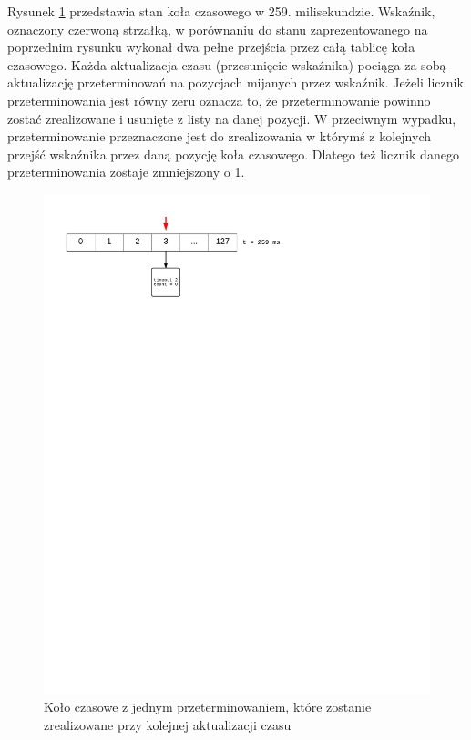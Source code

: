 Rysunek \ref{fig:tiw3} przedstawia stan koła czasowego w 259. milisekundzie.
Wskaźnik, oznaczony czerwoną strzałką, w porównaniu do stanu zaprezentowanego na poprzednim rysunku wykonał dwa pełne przejścia przez całą tablicę koła czasowego.
Każda aktualizacja czasu (przesunięcie wskaźnika) pociąga za sobą aktualizację przeterminowań na pozycjach mijanych przez wskaźnik.
Jeżeli licznik przeterminowania jest równy zeru oznacza to, że przeterminowanie powinno zostać zrealizowane i usunięte z listy na danej pozycji.
W przeciwnym wypadku, przeterminowanie przeznaczone jest do zrealizowania w którymś z kolejnych przejść wskaźnika przez daną pozycję koła czasowego. Dlatego też licznik danego przeterminowania zostaje zmniejszony o 1.

\begin{figure}[h]
\centerline{\includegraphics[scale=0.75, clip, trim=10mm 220mm 80mm 10mm]{tiw3}}
\caption{Koło czasowe z jednym przeterminowaniem, które zostanie zrealizowane przy kolejnej aktualizacji czasu}
\label{fig:tiw3}
\end{figure}

